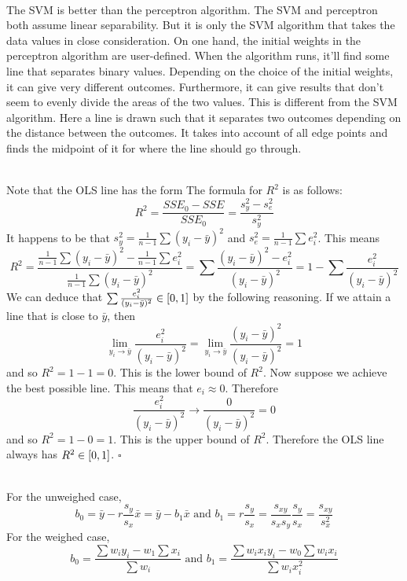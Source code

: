 \documentclass[12pt]{article}
\begin{document}
\begin{enumerate}

 \\
The SVM is better than the perceptron algorithm. The SVM and perceptron both assume linear separability. But it is only the SVM algorithm that takes the data values in close consideration. On one hand, the initial weights in the perceptron algorithm are user-defined. When the algorithm runs, it'll find some line that separates binary values. Depending on the choice of the initial weights, it can give very different outcomes. Furthermore, it can give results that don't seem to evenly divide the areas of the two values. This is different from the SVM algorithm. Here a line is drawn such that it separates two outcomes depending on the distance between the outcomes. It takes into account of all edge points and finds the midpoint of it for where the line should go through. 

 \\
Note that the OLS line has the form 
The formula for $R^2$ is as follows: 
$$ R^2 = \frac{SSE_0 - SSE}{SSE_0} = \frac{s_y^2 - s_e^2}{s_y^2}$$ 
It happens to be that $s_y^2 = \frac{1}{n-1}\sum (y_i - \bar{y})^2$ and $s_e^2 = \frac{1}{n-1} \sum e_i^2 $. This means $$R^2 = \frac{\frac{1}{n-1} \sum (y_i - \bar{y})^2 - \frac{1}{n-1}\sum e_i^2}{\frac{1}{n-1} \sum (y_i - \bar{y})^2} = \sum \frac{(y_i - \bar{y})^2 - e_i^2}{(y_i - \bar{y})^2} = 1 - \sum \frac{e_i^2}{(y_i - \bar{y})^2} $$ 
We can deduce that $\sum \frac{e_i^2}{(y_i - \bar{y})^2} \in \left[0,1\right]$ by the following reasoning. If we attain a line that is close to $\bar{y}$, then 
$$ \lim_{y_i \to \bar{y}} \frac{e_i^2}{(y_i - \bar{y})^2} = \lim_{y_i \to \bar{y}} \frac{(y_i - \bar{y})^2}{(y_i - \bar{y})^2} = 1 $$ 
and so $R^2 = 1 - 1 = 0$. This is the lower bound of $R^2$. Now suppose we achieve the best possible line. This means that $e_i \approx 0$. Therefore 
$$\frac{e_i^2}{(y_i - \bar{y})^2} \to \frac{0}{(y_i - \bar{y})^2} = 0 $$
and so $R^2 = 1 - 0 = 1$. This is the upper bound of $R^2$. Therefore the OLS line always has $R^2 \in \left[0,1\right]$. $\square$
\newpage

 \\
For the unweighed case, $$b_0 = \bar{y} - r\frac{s_y}{s_x}\bar{x} = \bar{y} - b_1\bar{x} \text{ and } b_1 = r\frac{s_y}{s_x} = \frac{s_{xy}}{s_xs_y}\frac{s_y}{s_x} = \frac{s_{xy}}{s_x^2} $$ 
For the weighed case, $$b_0 = \frac{\sum w_iy_i - w_1\sum x_i}{\sum w_i} \text{ and } b_1 = \frac{\sum w_ix_iy_i - w_0\sum w_ix_i}{\sum w_ix_i^2}$$ 


\end{enumerate}
\end{document}
